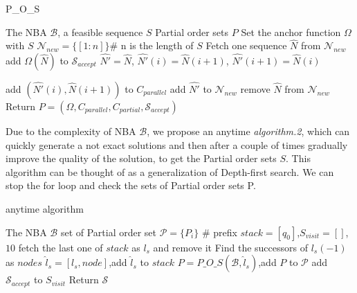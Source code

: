 \documentclass[journal]{IEEEtran}
\begin{document}
\begin{algorithm}
\caption{P\_O\_S}
\label{alg:1}
\renewcommand{\algorithmicrequire}{\textbf{Input:}}  %
\renewcommand{\algorithmicensure}{\textbf{Output:}} %
\begin{algorithmic}[1]
\Require The NBA $\mathcal{B}$, a feasible sequence $S$
\Ensure  Partial order sets $P$
\State Set the anchor function $\Omega$ with $S$
\State $\mathcal{N}_{new}=\{[1:n]\}$\# n is the length of $S$
\State Fetch one sequence $\hat{N}$ from $\mathcal{N}_{new}$
\State add $\Omega(\hat{N})$ to $\mathcal{S}_{accept}$
\State $\hat{N'}=\hat{N}$, $\hat{N'}(i)=\hat{N}(i+1)$, $\hat{N'}(i+1)=\hat{N}(i)$


\State add $(\hat{N'}(i),\hat{N}(i+1))$ to $C_{parallel}$
\State add $ \hat{N'}$ to $\mathcal{N}_{new}$
\EndIf
\EndFor
\State remove $\hat{N}$ from $\mathcal{N}_{new}$ 
\EndWhile
\State Return $P=(\Omega,C_{parallel},C_{partial},\mathcal{S}_{accept})$
\end{algorithmic}
\end{algorithm}

Due to the complexity of NBA $\mathcal{B}$, we propose an anytime \emph{algorithm.2}, which can quickly generate a not exact solutions and then after a couple of times gradually improve the quality of the solution, to get the Partial order sets $S$. This algorithm can be thought of as a generalization of Depth-first search. We can stop the for loop and check the sets of Partial order sets P.

\begin{algorithm}
	\caption{anytime algorithm}
	\label{alg:2}
	\renewcommand{\algorithmicrequire}{\textbf{Input:}}  %
	\renewcommand{\algorithmicensure}{\textbf{Output:}} %
	\begin{algorithmic}[1]
		\Require The NBA $\mathcal{B}$
		\Ensure  set of Partial order set $\mathcal{P}=\{P_i\}$
		 \# prefix
		\State $stack=[q_0]$,$S_{visit}=[]$,$10$
		\State fetch the last one of $stack$ as $l_{s}$ and remove it
		\State Find the successors of $l_{s}(-1)$ as $nodes$
		\State $\hat{l}_{s}=[l_{s},node]$,add $\hat{l}_{s}$ to $stack$
		\State $P=P\_O\_S(\mathcal{B},\hat{l}_{s})$,add $P$ to $\mathcal{P}$
		\State add $\mathcal{S}_{accept}$ to $S_{visit}$
		\EndIf
		\EndIf
		\EndFor
		\EndWhile
		\EndFor
		\State Return $\mathcal{S}$
	\end{algorithmic}
\end{algorithm}
\end{document}
